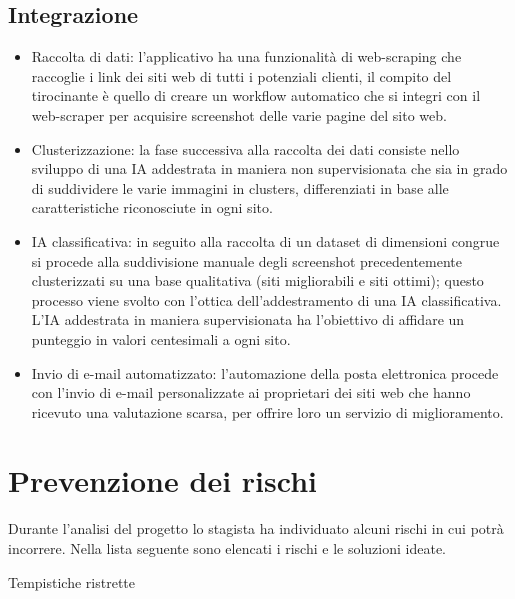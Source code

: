 \subsection{Integrazione}
\begin{itemize}
    \item Raccolta di dati: l'applicativo ha una funzionalità di web-scraping che raccoglie i link dei siti web di tutti i potenziali clienti, il compito del tirocinante è quello di creare un workflow automatico che si integri con il web-scraper per acquisire screenshot delle varie pagine del sito web. 
    \item Clusterizzazione: la fase successiva alla raccolta dei dati consiste nello sviluppo di una IA addestrata in maniera non supervisionata che sia in grado di suddividere le varie immagini in clusters, differenziati in base alle caratteristiche riconosciute in ogni sito. 
    \item IA classificativa: in seguito alla raccolta di un dataset di dimensioni congrue si procede alla suddivisione manuale degli screenshot precedentemente clusterizzati su una base qualitativa (siti migliorabili e siti ottimi); questo processo viene svolto con l'ottica dell'addestramento di una IA classificativa.
    L'IA addestrata in maniera supervisionata ha l'obiettivo di affidare un punteggio in valori centesimali a ogni sito. 
    \item Invio di e-mail automatizzato: l'automazione della posta elettronica procede con l'invio di e-mail personalizzate ai proprietari dei siti web che hanno ricevuto una valutazione scarsa, per offrire loro un servizio di miglioramento.
\end{itemize}

\section{Prevenzione dei rischi}
Durante l'analisi del progetto lo stagista ha individuato alcuni rischi in cui potrà incorrere.
Nella lista seguente sono elencati i rischi e le soluzioni ideate.\\

\begin{risk}{Tempistiche ristrette}
    \label{risk: tempistiche ristrette} 
\end{risk}

